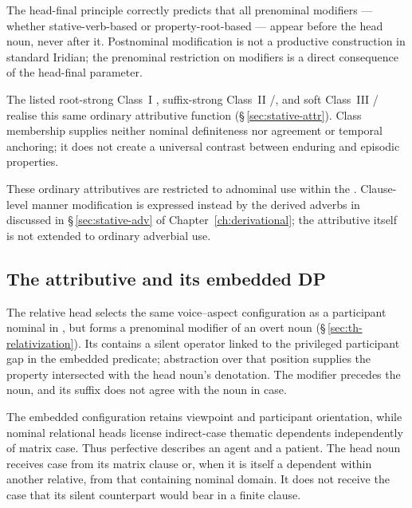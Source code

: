 The head-final principle correctly predicts that all prenominal modifiers —
whether stative-verb-based or property-root-based — appear before the head noun,
never after it. Postnominal modification is not a productive construction in
standard Iridian; the prenominal restriction on modifiers is a direct
consequence of the head-final parameter.

\pex
\a {} 
\a {} 
\a {} 
\a {} 
\a {} 
\xe

The listed root-strong Class~I , suffix-strong Class~II
/, and soft Class~III
/ realise this same ordinary attributive
function (§\,\ref{sec:stative-attr}). Class membership supplies neither
nominal definiteness nor agreement or temporal anchoring; it does not create
a universal contrast between enduring and episodic properties.

\noindent These ordinary attributives are restricted to adnominal use within
the . Clause-level manner modification is expressed instead by the
derived adverbs in  discussed in §\,\ref{sec:stative-adv} of
Chapter~\ref{ch:derivational}; the attributive itself is not extended to ordinary
adverbial use.

\subsection{The  attributive and its embedded DP}
\label{sec:nm-ovni}

The relative head  selects the same voice--aspect
configuration as a participant nominal in , but forms a prenominal
modifier of an overt noun (§\,\ref{sec:th-relativization}). Its
 contains a silent operator linked to the privileged participant
gap in the embedded predicate; abstraction over that position supplies the
property intersected with the head noun's denotation. The modifier precedes the
noun, and its suffix does not agree with the noun in case.

The embedded configuration retains viewpoint and participant orientation,
while nominal relational heads license indirect-case thematic dependents
independently of matrix case. Thus perfective  describes an
agent and  a patient. The head noun receives case from its
matrix clause or, when it is itself a dependent within another relative,
from that containing nominal domain. It does not receive the case that its
silent counterpart would bear in a finite clause.

